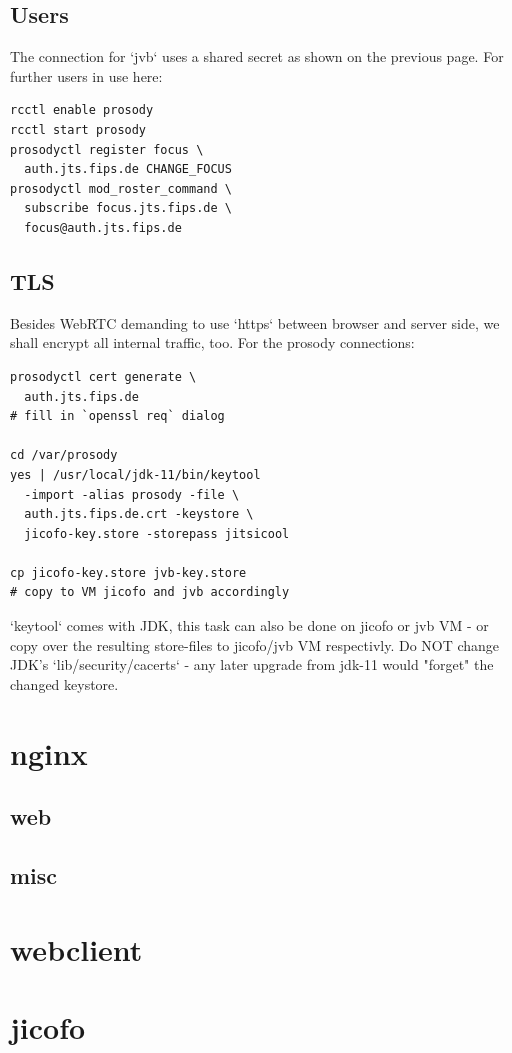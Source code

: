\documentclass[conference]{IEEEtran}
\begin{document}
\subsection{Users}
The connection for `jvb` uses a shared secret as shown on the previous page.
For further users in use here:
\begin{verbatim}
rcctl enable prosody
rcctl start prosody
prosodyctl register focus \
  auth.jts.fips.de CHANGE_FOCUS
prosodyctl mod_roster_command \ 
  subscribe focus.jts.fips.de \
  focus@auth.jts.fips.de
\end{verbatim}
\subsection{TLS}
Besides WebRTC demanding to use `https` between browser and server side, we shall
encrypt all internal traffic, too. For the prosody connections:
\begin{verbatim}
prosodyctl cert generate \
  auth.jts.fips.de
# fill in `openssl req` dialog

cd /var/prosody
yes | /usr/local/jdk-11/bin/keytool
  -import -alias prosody -file \
  auth.jts.fips.de.crt -keystore \
  jicofo-key.store -storepass jitsicool
  
cp jicofo-key.store jvb-key.store 
# copy to VM jicofo and jvb accordingly
\end{verbatim}
`keytool` comes with JDK, this task can also be done on jicofo or jvb VM - or copy
over the resulting store-files to jicofo/jvb VM respectivly.
Do NOT change JDK's `lib/security/cacerts` - any later upgrade from jdk-11
would "forget" the changed keystore.

\section{nginx}
\subsection{web}
\subsection{misc}
\section{webclient}
\section{jicofo}
\end{document}
